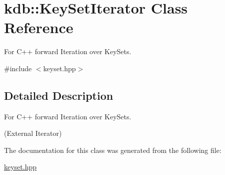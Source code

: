 \hypertarget{classkdb_1_1KeySetIterator}{}\section{kdb\+::Key\+Set\+Iterator Class Reference}
\label{classkdb_1_1KeySetIterator}


For C++ forward Iteration over Key\+Sets.  




{\ttfamily \#include $<$keyset.\+hpp$>$}



\subsection{Detailed Description}
For C++ forward Iteration over Key\+Sets. 

(External Iterator) 
\begin{DoxyCode}{0}
\DoxyCodeLine{\{}
\DoxyCodeLine{\}}
\end{DoxyCode}
 

The documentation for this class was generated from the following file\+:\begin{DoxyCompactItemize}
\item 
\mbox{\hyperlink{keyset_8hpp}{keyset.\+hpp}}\end{DoxyCompactItemize}
